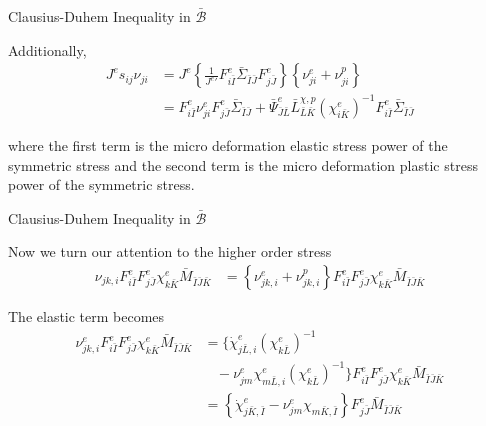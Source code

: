 \documentclass[11pt]{beamer}
\begin{document}
\begin{frame}{Clausius-Duhem Inequality in $\bar{\mathcal{B}}$}

Additionally,
\begin{align*}
J^e  s_{ij} \nu_{ji} &= J^e \left\{ \frac{1}{{J^e}'} F_{i\bar{I}}^e \bar{\Sigma}_{\bar{I}\bar{J}} F_{j\bar{J}}^e \right\} \left\{ \nu_{ji}^e + \nu_{ji}^p\right\}\\
&= F_{i\bar{I}}^e \nu_{ji}^e F_{j\bar{J}}^e \bar{\Sigma}_{\bar{I}\bar{J}}  + \bar{\Psi}_{\bar{J}\bar{L}}^e \bar{L}_{\bar{L}\bar{K}}^{\chi,p} \left(\chi_{i\bar{K}}^e\right)^{-1} F_{i\bar{I}}^e \bar{\Sigma}_{\bar{I}\bar{J}} 
\end{align*}

where the first term is the micro deformation elastic stress power of the symmetric stress and the second term is the micro deformation plastic stress power of the symmetric stress.

\end{frame}

\begin{frame}{Clausius-Duhem Inequality in $\bar{\mathcal{B}}$}

Now we turn our attention to the higher order stress
\begin{align*}
\nu_{jk,i} F_{i\bar{I}}^e F_{j\bar{J}}^e \chi_{k\bar{K}}^e \bar{M}_{\bar{I}\bar{J}\bar{K}} &= \left\{ \nu_{jk,i}^e + \nu_{jk,i}^p \right\} F_{i\bar{I}}^e F_{j\bar{J}}^e \chi_{k\bar{K}}^e \bar{M}_{\bar{I}\bar{J}\bar{K}}
\end{align*}

The elastic term becomes
\begin{align*}
\nu_{jk,i}^e F_{i\bar{I}}^e F_{j\bar{J}}^e \chi_{k\bar{K}}^e \bar{M}_{\bar{I}\bar{J}\bar{K}} &= \bigg\{ \dot{\chi}_{j\bar{L},i}^e \left(\chi_{k\bar{L}}^e\right)^{-1}\\
&\ \ \ \ - \nu_{jm}^e \chi_{m\bar{L},i}^e\left(\chi_{k\bar{L}}^e\right)^{-1}\bigg\}F_{i\bar{I}}^e F_{j\bar{J}}^e \chi_{k\bar{K}}^e \bar{M}_{\bar{I}\bar{J}\bar{K}}\\
&= \left\{\dot{\chi}_{j\bar{K},\bar{I}}^e - \nu_{jm}^e \chi_{m\bar{K},\bar{I}}\right\} F_{j\bar{J}}^e\bar{M}_{\bar{I}\bar{J}\bar{K}}\\
\end{align*}

\end{frame}
\end{document}
